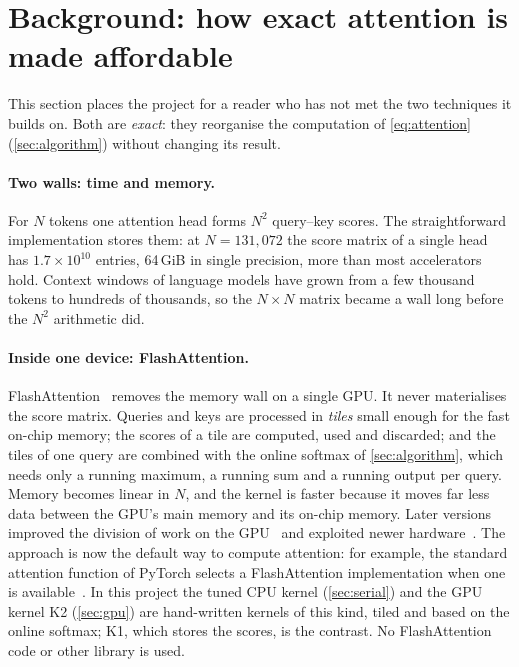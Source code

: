 \section{Background: how exact attention is made affordable}\label{sec:background}

This section places the project for a reader who has not met the two techniques it
builds on. Both are \emph{exact}: they reorganise the computation of
\cref{eq:attention} (\cref{sec:algorithm}) without changing its result.

\paragraph{Two walls: time and memory.} For $N$ tokens one attention head forms
$N^2$ query--key scores. The straightforward implementation stores them: at
$N=131{,}072$ the score matrix of a single head has $1.7\times10^{10}$ entries, 64\,GiB
in single precision, more than most accelerators hold. Context windows of language
models have grown from a few thousand tokens to hundreds of thousands, so the
$N\times N$ matrix became a wall long before the $N^2$ arithmetic did.

\paragraph{Inside one device: FlashAttention.} FlashAttention~\cite{flash} removes
the memory wall on a single GPU. It never materialises the score matrix. Queries
and keys are processed in \emph{tiles} small enough for the fast on-chip memory;
the scores of a tile are computed, used and discarded; and the tiles of one query
are combined with the online softmax of \cref{sec:algorithm}, which needs only a
running maximum, a running sum and a running output per query. Memory becomes
linear in $N$, and the kernel is faster because it moves far less data between the
GPU's main memory and its on-chip memory. Later versions improved the division of
work on the GPU~\cite{flash2} and exploited newer hardware~\cite{flash3}. The
approach is now the default way to compute attention: for example, the standard
attention function of PyTorch selects a FlashAttention implementation when one is
available~\cite{sdpa}. In this project the tuned CPU kernel (\cref{sec:serial}) and
the GPU kernel K2 (\cref{sec:gpu}) are hand-written kernels of this kind, tiled and
based on the online softmax; K1, which stores the scores, is the contrast. No
FlashAttention code or other library is used.

